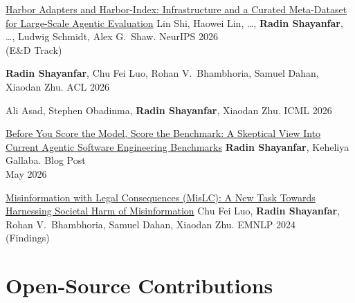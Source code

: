 \documentclass[11pt,letterpaper]{article}
\begin{document}
\pubentry
  {\href{https://arxiv.org/abs/2609.04298}{Harbor Adapters and Harbor-Index: Infrastructure and a Curated Meta-Dataset for Large-Scale Agentic Evaluation}}
  {Lin Shi, Haowei Lin, \ldots, \textbf{Radin Shayanfar}, \ldots, Ludwig Schmidt, Alex G.\ Shaw.}
  {NeurIPS 2026\\(E\&D Track)}

  {\textbf{Radin Shayanfar}, Chu Fei Luo, Rohan V.\ Bhambhoria, Samuel Dahan, Xiaodan Zhu.}
  {ACL 2026}

  {Ali Asad, Stephen Obadinma, \textbf{Radin Shayanfar}, Xiaodan Zhu.}
  {ICML 2026}

\pubentry
  {\href{https://centre-for-software-excellence.github.io/docs/blog/before-you-score-the-model-score-the-benchmark}{Before You Score the Model, Score the Benchmark: A Skeptical View Into Current Agentic Software Engineering Benchmarks}}
  {\textbf{Radin Shayanfar}, Keheliya Gallaba.}
  {Blog Post\\May 2026}

\pubentry
  {\href{https://aclanthology.org/2024.findings-emnlp.924/}{Misinformation with Legal Consequences (MisLC): A New Task Towards Harnessing Societal Harm of Misinformation}}
  {Chu Fei Luo, \textbf{Radin Shayanfar}, Rohan V.\ Bhambhoria, Samuel Dahan, Xiaodan Zhu.}
  {EMNLP 2024\\(Findings)}

\section*{Open-Source Contributions}
\end{document}
